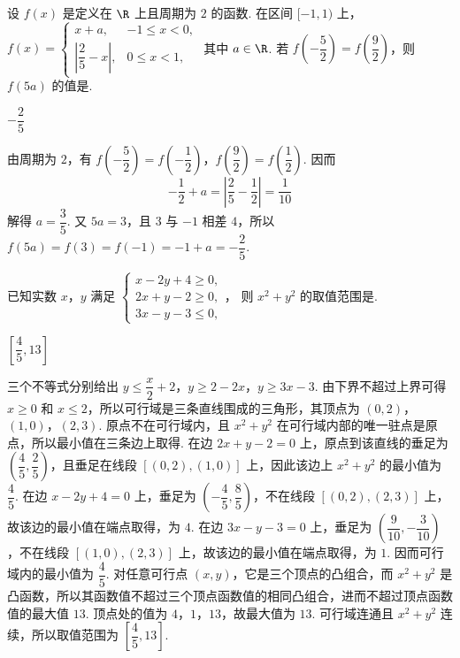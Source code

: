 \begin{problem}
设 \(f(x)\) 是定义在 \(\R\) 上且周期为 \(2\) 的函数. 在区间 \([-1,1)\) 上，
\(
f(x)=
\begin{cases}
x+a,&-1\le x<0,\\
\left|\dfrac25-x\right|,&0\le x<1,
\end{cases}
\)
其中 \(a\in\R\). 若 \(f\left(-\dfrac52\right)=f\left(\dfrac92\right)\)，则 \(f(5a)\) 的值是\fillinblank{}.
\end{problem}

\begin{answer}
\(-\dfrac25\)
\end{answer}

\begin{solution}
由周期为 \(2\)，有 \(f\left(-\dfrac52\right)=f\left(-\dfrac12\right)\)，\(f\left(\dfrac92\right)=f\left(\dfrac12\right)\). 因而
\[
-\dfrac12+a=\left|\dfrac25-\dfrac12\right|=\dfrac1{10}
\]
解得 \(a=\dfrac35\). 又 \(5a=3\)，且 \(3\) 与 \(-1\) 相差 \(4\)，所以 \(f(5a)=f(3)=f(-1)=-1+a=-\dfrac25\).
\end{solution}

\begin{problem}
已知实数 \(x\)，\(y\) 满足
\(
\begin{cases}
x-2y+4\ge0,\\
2x+y-2\ge0,\\
3x-y-3\le0,
\end{cases}
\)，
则 \(x^2+y^2\) 的取值范围是\fillinblank{}.
\end{problem}

\begin{answer}
\(\left[\dfrac45,13\right]\)
\end{answer}

\begin{solution}
三个不等式分别给出
\(y\le\dfrac{x}{2}+2\)，\(y\ge2-2x\)，\(y\ge3x-3\).
由下界不超过上界可得 \(x\ge0\) 和 \(x\le2\)，所以可行域是三条直线围成的三角形，其顶点为
\((0,2)\)，\((1,0)\)，\((2,3)\).
原点不在可行域内，且 \(x^2+y^2\) 在可行域内部的唯一驻点是原点，所以最小值在三条边上取得. 在边 \(2x+y-2=0\) 上，原点到该直线的垂足为 \(\left(\dfrac45,\dfrac25\right)\)，且垂足在线段 \([(0,2),(1,0)]\) 上，因此该边上 \(x^2+y^2\) 的最小值为 \(\dfrac45\). 在边 \(x-2y+4=0\) 上，垂足为 \(\left(-\dfrac45,\dfrac85\right)\)，不在线段 \([(0,2),(2,3)]\) 上，故该边的最小值在端点取得，为 \(4\). 在边 \(3x-y-3=0\) 上，垂足为 \(\left(\dfrac9{10},-\dfrac3{10}\right)\)，不在线段 \([(1,0),(2,3)]\) 上，故该边的最小值在端点取得，为 \(1\). 因而可行域内的最小值为 \(\dfrac45\). 对任意可行点 \((x,y)\)，它是三个顶点的凸组合，而 \(x^2+y^2\) 是凸函数，所以其函数值不超过三个顶点函数值的相同凸组合，进而不超过顶点函数值的最大值 \(13\). 顶点处的值为 \(4\)，\(1\)，\(13\)，故最大值为 \(13\). 可行域连通且 \(x^2+y^2\) 连续，所以取值范围为 \(\left[\dfrac45,13\right]\).
\end{solution}

